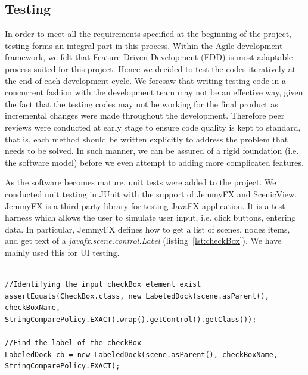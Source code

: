 \subsection{Testing}
In order to meet all the requirements specified at the beginning of the project, testing forms an integral part in this process. Within the Agile development framework, we felt that Feature Driven Development (FDD) is most adaptable process suited for this project. Hence we decided to test the codes iteratively at the end of each development cycle. We foresaw that writing testing code in a concurrent fashion with the development team may not be an effective way, given the fact that the testing codes may not be working for the final product as incremental changes were made throughout the development. Therefore peer reviews were conducted at early stage to ensure  code quality is kept to standard, that is, each method should be written explicitly to address the problem that needs to be solved. In such manner, we can be assured of a rigid foundation (i.e. the software model) before we even attempt to adding more complicated features.

As the software becomes mature, unit tests were added to the project. We conducted unit testing in JUnit with the support of JemmyFX and ScenicView. JemmyFX is a third party library for testing JavaFX application. It is a test harness which allows the user to simulate user input, i.e. click buttons, entering data. In particular, JemmyFX defines how to get a list of scenes, nodes items, and get text of a \textit{javafx.scene.control.Label} (listing~\ref{lst:checkBox}). We have mainly used this for UI testing. 


\begin{minipage}{0.9\textwidth}
	\begin{lstlisting}[caption={Use JemmyFX syntax to find a checkBox element}, label={lst:checkBox}]

//Identifying the input checkBox element exist
assertEquals(CheckBox.class, new LabeledDock(scene.asParent(), checkBoxName, StringComparePolicy.EXACT).wrap().getControl().getClass());

//Find the label of the checkBox 
LabeledDock cb = new LabeledDock(scene.asParent(), checkBoxName, StringComparePolicy.EXACT);

	\end{lstlisting}
\end{minipage}

